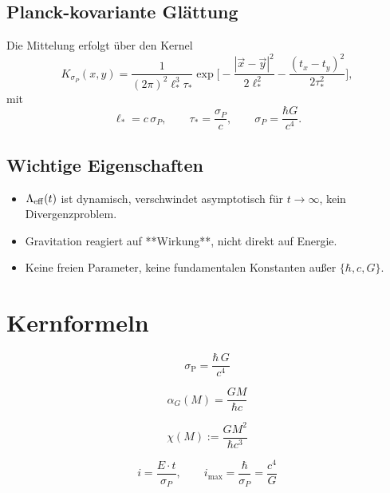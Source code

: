 \documentclass[11pt,a4paper]{article}
\begin{document}
\subsection*{Planck-kovariante Glättung}

Die Mittelung erfolgt über den Kernel
\begin{equation}
K_{\sigma_P}(x,y) = \frac{1}{(2\pi)^2 \ell_\ast^3 \tau_\ast} 
\exp\Bigg[
- \frac{|\vec x - \vec y|^2}{2 \ell_\ast^2} 
- \frac{(t_x - t_y)^2}{2 \tau_\ast^2}
\Bigg],
\end{equation}
mit
\begin{equation}
\ell_\ast = c \, \sigma_P, \qquad \tau_\ast = \frac{\sigma_P}{c}, \qquad 
\sigma_P = \frac{\hbar G}{c^4}.
\end{equation}

\subsection*{Wichtige Eigenschaften}

\begin{itemize}
    \item $\Lambda_{\rm eff}(t)$ ist dynamisch, verschwindet asymptotisch für $t \to \infty$, kein Divergenzproblem.
    \item Gravitation reagiert auf **Wirkung**, nicht direkt auf Energie.
    \item Keine freien Parameter, keine fundamentalen Konstanten außer $\{\hbar, c, G\}$.
\end{itemize}

\section{Kernformeln}
\begin{equation}
\sigma_{\mathrm P} = \frac{\hbar\, G}{c^{4}}
\end{equation}

\begin{equation}
\alpha_{G}(M) = \frac{G M}{\hbar c}
\end{equation}

\begin{equation}
\chi(M) := \frac{G M^{2}}{\hbar c^{3}}
\end{equation}

\begin{equation}
i = \frac{E\cdot t}{\sigma_P},\qquad i_{\max} = \frac{\hbar}{\sigma_P} = \frac{c^4}{G}
\end{equation}
\end{document}
